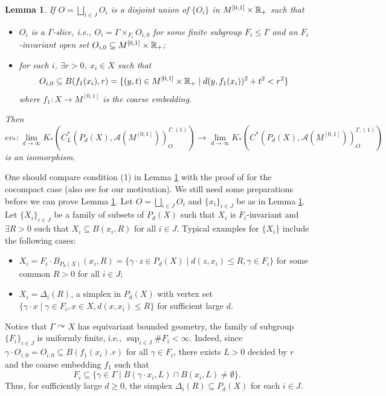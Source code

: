 \documentclass[11pt]{article}
\theoremstyle{definition}
\theoremstyle{plain}
\newtheorem{Lem}[Def]{Lemma}
\def\A{\mathcal A}\def\C{\mathcal C}\def\B{\mathcal B}\def\E{\mathcal E}\def\O{\mathcal O}\def\h{\mathfrak h}\def\K{\mathcal K}\def\F{\mathcal F}\def\P{\mathcal P}\def\L{\mathcal L}\def\R{\mathcal R}\def\Q{\mathcal Q}\def\H{\mathcal H}\def\S{\mathcal S}\def\N{\mathcal N}\def\U{\mathcal U}\def\V{\mathcal V}
\def\Ga{\Gamma}
\def\car{\curvearrowright}
\begin{document}
\begin{Lem}\label{iso for slice}
If $O=\bigsqcup_{i\in J}O_i$ is a disjoint union of $\{O_i\}$ in $M^{[0,1]}\times\mathbb R_+$ such that\begin{itemize}
\item[(1)] $O_i$ is a $\Ga$-slice, i.e., $O_i=\Ga\times_{F_i}O_{i,0}$ for some finite subgroup $F_i\leq\Ga$ and an $F_i$-invariant open set $O_{i,0}\subseteq M^{[0,1]}\times\mathbb R_+$;
\item[(2)] for each $i$, $\exists r>0$, $x_i\in X$ such that
$$O_{i,0}\subseteq B(f_1(x_i),r)=\{(y,t)\in M^{[0,1]}\times\mathbb R_+\mid d(y,f_1(x_i))^2+t^2<r^2\}$$
where $f_1:X\to M^{[0,1]}$ is the coarse embedding.
\end{itemize}
Then
$$ev_*:\lim_{d\to\infty}K_*\left(C^*_L(P_d(X),\A(M^{[0,1]}))^{\Ga,(1)}_O\right)\to\lim_{d\to\infty}K_*\left(C^*(P_d(X),\A(M^{[0,1]}))^{\Ga,(1)}_O\right)$$
is an isomorphism.
\end{Lem}

One should compare condition (1) in Lemma \ref{iso for slice} with the proof of \cite[Theorem 13.1]{GHT2000} for the cocompact case (also see \cite[Proposition 3.3]{GW2022} for our motivation). We still need some preparations before we can prove Lemma \ref{iso for slice}. Let $O=\bigsqcup_{i\in J} O_i$ and $\{x_i\}_{i\in J}$ be as in Lemma \ref{iso for slice}. Let $\{X_i\}_{i\in J}$ be a family of subsets of $P_d(X)$ such that $X_i$ is $F_i$-invariant and $\exists R>0$ such that $X_i\subseteq B(x_i,R)$ for all $i\in J$. Typical examples for $\{X_i\}$ include the following cases:\begin{itemize}
\item[(1)] $X_i=F_i\cdot B_{P_d(X)}(x_i,R)=\{\gamma\cdot z\in P_d(X)\mid d(z,x_i)\leq R, \gamma\in F_i\}$ for some common $R>0$ for all $i\in J$;
\item[(2)] $X_i=\Delta_i(R)$, a simplex in $P_d(X)$ with vertex set $\{\gamma\cdot x\mid \gamma\in F_i,x\in X, d(x,x_i)\leq R\}$ for sufficient large $d$.
\end{itemize}
Notice that $\Ga\car X$ has equivariant bounded geometry, the family of subgroup $\{F_i\}_{i\in J}$ is uniformly finite, i.e., $\sup_{i\in J}\#F_i<\infty$. Indeed, since $\gamma\cdot O_{i,0}=O_{i,0}\subseteq B(f_1(x_i).r)$ for all $\gamma\in F_i$, there exists $L>0$ decided by $r$ and the coarse embedding $f_1$ such that 
$$F_i\subseteq \{\gamma\in\Ga\mid B(\gamma\cdot x_i,L)\cap B(x_i,L)\ne\emptyset\}.$$
Thus, for sufficiently large $d\geq 0$, the simplex $\Delta_i(R)\subseteq P_d(X)$  for each $i\in J$.
\end{document}
